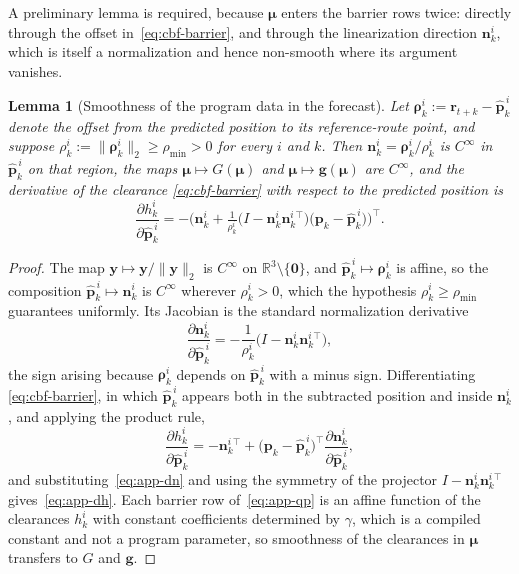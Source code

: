 \documentclass[11pt]{article}
\theoremstyle{plain}
\newtheorem{lemma}{Lemma}
\theoremstyle{definition}
\newcommand{\R}{\mathbb{R}}
\begin{document}
A preliminary lemma is required, because $\bm{\mu}$ enters the barrier
rows twice: directly through the offset in~\eqref{eq:cbf-barrier}, and
through the linearization direction $\bm{n}^i_k$, which is itself a
normalization and hence non-smooth where its argument vanishes.

\begin{lemma}[Smoothness of the program data in the forecast]
	\label{lem:data-smooth}
	Let $\bm{\rho}^{i}_{k}
		:=\bm{r}_{t+k}-\hat{\bm{p}}^{\,i}_{k}$ denote the offset from the
	predicted position to its reference-route point, and suppose
	$\rho^{i}_{k}:=\|\bm{\rho}^{i}_{k}\|_2\geq\rho_{\min}>0$ for every
	$i$ and $k$. Then $\bm{n}^{i}_{k}
		=\bm{\rho}^{i}_{k}/\rho^{i}_{k}$ is $C^{\infty}$ in
	$\hat{\bm{p}}^{\,i}_{k}$ on that region, the maps
	$\bm{\mu}\mapsto G(\bm{\mu})$ and $\bm{\mu}\mapsto\bm{g}(\bm{\mu})$
	are $C^{\infty}$, and the derivative of the clearance
	\eqref{eq:cbf-barrier} with respect to the predicted position is
	\begin{equation}
		\label{eq:app-dh}
		\frac{\partial h^{i}_{k}}
		{\partial\hat{\bm{p}}^{\,i}_{k}}
		=-\Big(
		\bm{n}^{i}_{k}
		+\tfrac{1}{\rho^{i}_{k}}
		\big(I-\bm{n}^{i}_{k}\bm{n}^{i\,\top}_{k}\big)
		\big(\bm{p}_{k}-\hat{\bm{p}}^{\,i}_{k}\big)
		\Big)^{\!\top}.
	\end{equation}
\end{lemma}

\begin{proof}
	The map $\bm{y}\mapsto\bm{y}/\|\bm{y}\|_2$ is $C^{\infty}$ on
	$\R^3\setminus\{\bm{0}\}$, and $\hat{\bm{p}}^{\,i}_{k}\mapsto
		\bm{\rho}^{i}_{k}$ is affine, so the composition
	$\hat{\bm{p}}^{\,i}_{k}\mapsto\bm{n}^{i}_{k}$ is $C^{\infty}$
	wherever $\rho^{i}_{k}>0$, which the hypothesis
	$\rho^{i}_{k}\geq\rho_{\min}$ guarantees uniformly. Its Jacobian is
	the standard normalization derivative
	\begin{equation}
		\label{eq:app-dn}
		\frac{\partial\bm{n}^{i}_{k}}
		{\partial\hat{\bm{p}}^{\,i}_{k}}
		=-\frac{1}{\rho^{i}_{k}}
		\big(I-\bm{n}^{i}_{k}\bm{n}^{i\,\top}_{k}\big),
	\end{equation}
	the sign arising because $\bm{\rho}^{i}_{k}$ depends on
	$\hat{\bm{p}}^{\,i}_{k}$ with a minus sign. Differentiating
	\eqref{eq:cbf-barrier}, in which $\hat{\bm{p}}^{\,i}_{k}$ appears
	both in the subtracted position and inside $\bm{n}^{i}_{k}$, and
	applying the product rule,
	\begin{equation}
		\frac{\partial h^{i}_{k}}
		{\partial\hat{\bm{p}}^{\,i}_{k}}
		=-\bm{n}^{i\,\top}_{k}
		+\big(\bm{p}_{k}-\hat{\bm{p}}^{\,i}_{k}\big)^{\!\top}
		\frac{\partial\bm{n}^{i}_{k}}
		{\partial\hat{\bm{p}}^{\,i}_{k}} ,
	\end{equation}
	and substituting~\eqref{eq:app-dn} and using the symmetry of the
	projector $I-\bm{n}^{i}_{k}\bm{n}^{i\,\top}_{k}$
	gives~\eqref{eq:app-dh}. Each barrier row
	of~\eqref{eq:app-qp} is an affine function of the clearances
	$h^{i}_{k}$ with constant coefficients determined by $\gamma$, which
	is a compiled constant and not a program parameter, so smoothness of
	the clearances in $\bm{\mu}$ transfers to $G$ and $\bm{g}$.
\end{proof}
\end{document}
